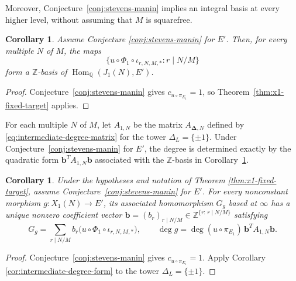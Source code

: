 \documentclass[12pt, letterpaper]{amsart}
\newtheorem{corollary}[theorem]{Corollary}
\theoremstyle{definition}
\theoremstyle{remark}
\newcommand{\Q}{\mathbb Q}
\newcommand{\Z}{\mathbb Z}
\newcommand{\Hom}{\operatorname{Hom}}
\numberwithin{equation}{section}
\begin{document}
Moreover, Conjecture~\ref{conj:stevens-manin} implies an integral basis at every higher
level, without assuming that \(M\) is squarefree.

\begin{corollary}\label{cor:x1-stevens-lattice}
Assume Conjecture \ref{conj:stevens-manin} for \(E'\). Then, for every multiple
\(N\) of \(M\), the maps
\[
        \bigl\{u\circ\Phi_1\circ\iota_{r,N,M,*}:r\mid N/M\bigr\}
\]
form a \(\Z\)-basis of \(\Hom_\Q(J_1(N),E')\).
\end{corollary}

\begin{proof}
Conjecture~\ref{conj:stevens-manin} gives \(c_{u\circ\pi_{E_1}}=1\), so
Theorem~\ref{thm:x1-fixed-target} applies.
\end{proof}

For each multiple \(N\) of \(M\), let \(A_{1,N}\) be the matrix
\(A_{\boldsymbol\Delta,N}\) defined by
\eqref{eq:intermediate-degree-matrix} for the tower
\(\Delta_L=\{\pm1\}\).
Under Conjecture~\ref{conj:stevens-manin} for \(E'\), the degree is determined exactly by the quadratic
form \(\boldsymbol b^{T}A_{1,N}\boldsymbol b\) associated with the \(\Z\)-basis
in Corollary~\ref{cor:x1-stevens-lattice}.

\begin{corollary}\label{cor:x1-degree-form}
Under the hypotheses and notation of Theorem \ref{thm:x1-fixed-target},
assume Conjecture~\ref{conj:stevens-manin} for \(E'\).
For every nonconstant morphism \(g:X_1(N)\to E'\), its associated
homomorphism \(G_g\) based at \(\infty\) has a unique nonzero coefficient
vector \(\boldsymbol b=(b_r)_{r\mid N/M}\in
\Z^{\{r:\,r\mid N/M\}}\) satisfying
\[
        G_g=\sum_{r\mid N/M}b_r
        \bigl(u\circ\Phi_1\circ\iota_{r,N,M,*}\bigr),
        \qquad
        \deg g=\deg(u\circ\pi_{E_1})\,
        \boldsymbol b^{T}A_{1,N}\boldsymbol b.
\]
\end{corollary}

\begin{proof}
Conjecture~\ref{conj:stevens-manin} gives \(c_{u\circ\pi_{E_1}}=1\).
Apply Corollary \ref{cor:intermediate-degree-form} to the tower
\(\Delta_L=\{\pm1\}\).
\end{proof}
\end{document}
